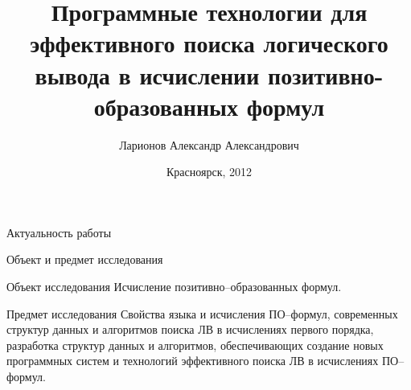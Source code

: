 \documentclass{beamer}
\begin{document}
\title{Программные технологии для эффективного поиска логического вывода в исчислении позитивно-образованных формул}  
\author{Ларионов Александр Александрович}
\date{Красноярск, 2012} 
\frame{\titlepage} 

\begin{frame}{Актуальность работы}
\end{frame}

\begin{frame}{Объект и предмет исследования}

\begin{block}{Объект исследования}
Исчисление позитивно--образованных формул. 
\end{block}

\begin{block}{Предмет исследования}
Свойства языка и исчисления ПО--формул, современных структур данных и алгоритмов поиска ЛВ в исчислениях первого порядка, разработка структур данных и алгоритмов, обеспечивающих создание новых программных систем и технологий эффективного поиска ЛВ в исчислениях ПО--формул. 
\end{block}

\end{frame}
\end{document}
